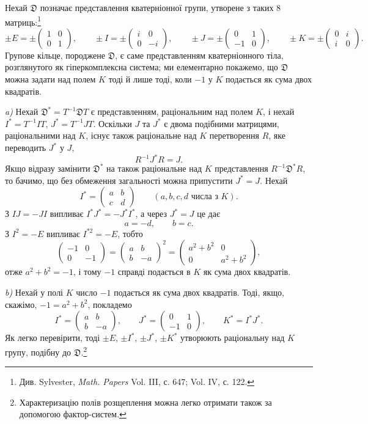 \documentclass[11pt]{article}
\newcommand{\mat}[1]{\begin{pmatrix}#1\end{pmatrix}}
\begin{document}
\noindent Нехай $\mathfrak{D}$ позначає представлення кватерніонної групи, утворене з таких 8 матриць:\footnote{Див. Sylvester, \emph{Math. Papers} Vol. III, с. 647; Vol. IV, с. 122.}
\[
\pm E=\pm\mat{1&0\\0&1},\qquad
\pm I=\pm\mat{i&0\\0&-i},\qquad
\pm J=\pm\mat{0&1\\-1&0},\qquad
\pm K=\pm\mat{0&i\\ i&0}.
\]
Групове кільце, породжене $\mathfrak{D}$, є саме представленням кватерніонного тіла, розглянутого як гіперкомплексна система; ми елементарно покажемо, що $\mathfrak{D}$ можна задати над полем $K$ тоді й лише тоді, коли $-1$ у $K$ подається як сума двох квадратів.

\medskip

\noindent \emph{a)} Нехай $\mathfrak{D}^*=T^{-1}\mathfrak{D}T$ є представленням, раціональним над полем $K$, і нехай $I^*=T^{-1}IT$, $J^*=T^{-1}JT$. Оскільки $J$ та $J^*$ є двома подібними матрицями, раціональними над $K$, існує також раціональне над $K$ перетворення $R$, яке переводить $J^*$ у $J$,
\[
        R^{-1}J^*R=J.
\]
Якщо відразу замінити $\mathfrak{D}^*$ на також раціональне над $K$ представлення $R^{-1}\mathfrak{D}^*R$, то бачимо, що без обмеження загальності можна припустити $J^*=J$. Нехай
\[
        I^*=\mat{a&b\\ c&d}\qquad (a,b,c,d\text{ числа з }K).
\]
З $IJ=-JI$ випливає $I^*J^*=-J^*I^*$, а через $J^*=J$ це дає
\[
        a=-d,
        \qquad b=c.
\]
З $I^2=-E$ випливає $I^{*2}=-E$, тобто
\[
        \mat{-1&0\\0&-1}=\mat{a&b\\ b&-a}^2
        =\mat{a^2+b^2&0\\0&a^2+b^2},
\]
отже $a^2+b^2=-1$, і тому $-1$ справді подається в $K$ як сума двох квадратів.

\medskip

\noindent \emph{b)} Нехай у полі $K$ число $-1$ подається як сума двох квадратів. Тоді, якщо, скажімо, $-1=a^2+b^2$, покладемо
\[
        I^*=\mat{a&b\\ b&-a},\qquad
        J^*=\mat{0&1\\-1&0},\qquad
        K^*=I^*J^*.
\]
Як легко перевірити, тоді $\pm E$, $\pm I^*$, $\pm J^*$, $\pm K^*$ утворюють раціональну над $K$ групу, подібну до $\mathfrak{D}$.\footnote{Характеризацію полів розщеплення можна легко отримати також за допомогою фактор-систем.}
\end{document}
